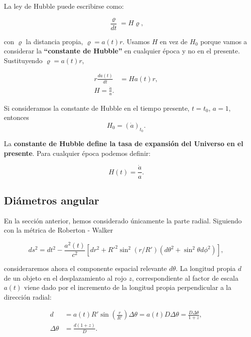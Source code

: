 \documentclass[11pt]{article}
\begin{document}
La ley de Hubble puede escribirse como: 


 \begin{equation}
        \frac{\varrho}{dt} = H\varrho,
    \end{equation}

con $\varrho$ la distancia propia, $\varrho = a(t) r$. Usamos $H$ en vez de $H_0$ porque vamos a considerar la {\bf{``constante de Hubble''}} en cualquier época y no en el presente. Sustituyendo $\varrho = a(t) r$,

    \begin{align}
        r\frac{da(t)}{dt} & = Ha(t)r, \\
        H = \frac{\dot{a}}{a}.
    \end{align}

Si consideramos la constante de Hubble en el tiempo presente, $t= t_0$, $a=1$, entonces 
    \begin{equation}
        H_0 = (\dot{a})_{t_0}.
    \end{equation}

La {\bf{constante de Hubble define la tasa de expansión del Universo en el presente}}. Para cualquier época podemos definir: 

    \begin{equation}
        H(t) = \frac{\dot{a}}{a}.
    \end{equation}

\subsection{Diámetros angular}

En la sección anterior, hemos considerado únicamente la parte radial. Siguiendo con la métrica de Roberton - Walker 

        $$ds^2 = dt^2 - \frac{a^2(t)}{c^2} [dr^2 + R'^2 \sin^2(r/R')(d \theta^2 + \sin^2 \theta d\phi^2)],$$
  
  consideraremos ahora el componente espacial relevante $d\theta$. La longitud propia $d$ de un objeto en el desplazamiento al rojo $z$, correspondiente al factor de escala $a(t)$ viene dado por el incremento de la longitud propia perpendicular a la dirección radial:
  
  \begin{align}
      d & = a(t) R' \sin \left(\frac{r}{R'} \right) \Delta \theta = a(t) D \Delta \theta = \frac{D \Delta \theta}{1+z}, \\
      \Delta \theta & = \frac{d(1+z)}{D}.
  \end{align}
\end{document}
